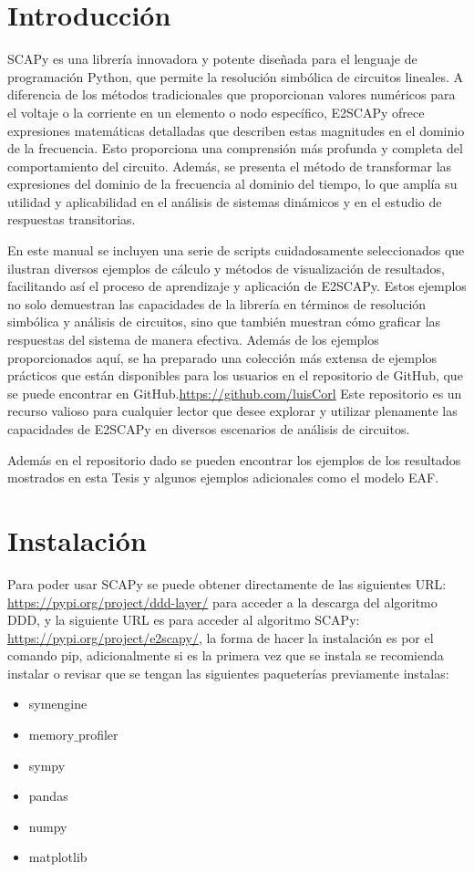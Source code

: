 \section{Introducción}
SCAPy es una librería innovadora y potente diseñada para el lenguaje de programación Python, que permite la resolución simbólica de circuitos lineales. A diferencia de los métodos tradicionales que proporcionan valores numéricos para el voltaje o la corriente en un elemento o nodo específico, E2SCAPy ofrece expresiones matemáticas detalladas que describen estas magnitudes en el dominio de la frecuencia. Esto proporciona una comprensión más profunda y completa del comportamiento del circuito. Además, se presenta el método de transformar las expresiones del dominio de la frecuencia al dominio del tiempo, lo que amplía su utilidad y aplicabilidad en el análisis de sistemas dinámicos y en el estudio de respuestas transitorias.
\par En este manual se incluyen una serie de scripts cuidadosamente seleccionados que ilustran diversos ejemplos de cálculo y métodos de visualización de resultados, facilitando así el proceso de aprendizaje y aplicación de E2SCAPy. Estos ejemplos no solo demuestran las capacidades de la librería en términos de resolución simbólica y análisis de circuitos, sino que también muestran cómo graficar las respuestas del sistema de manera efectiva. Además de los ejemplos proporcionados aquí, se ha preparado una colección más extensa de ejemplos prácticos que están disponibles para los usuarios en el repositorio de GitHub, que se puede encontrar en GitHub.\url{https://github.com/luisCorl} Este repositorio es un recurso valioso para cualquier lector que desee explorar y utilizar plenamente las capacidades de E2SCAPy en diversos escenarios de análisis de circuitos.
\par 
Además en el repositorio dado se pueden encontrar los ejemplos de los resultados mostrados en esta Tesis y algunos ejemplos adicionales como el modelo EAF.
\section{Instalación}
Para poder usar SCAPy se puede obtener directamente de las siguientes URL: \url{https://pypi.org/project/ddd-layer/} para acceder a la descarga del algoritmo DDD, y la siguiente URL es para acceder al algoritmo SCAPy: \url{https://pypi.org/project/e2scapy/}, la forma de hacer la instalación es por el comando pip, adicionalmente si es la primera vez que se instala se recomienda instalar o revisar que se tengan las siguientes paqueterías previamente instalas:
\begin{itemize}
	\item symengine
	\item memory$\_$profiler
	\item sympy
	\item pandas
	\item numpy
	\item matplotlib
\end{itemize}


